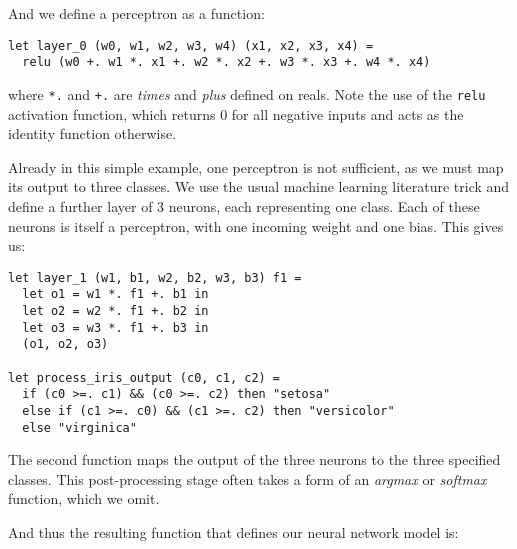 \documentclass[runningheads]{llncs}
\begin{document}
\begin{comment}
To process inputs of this type in the future, we can simply define

\begin{lstlisting}[language=caml]
let process_iris_input (x: iris_input) =
  let x0 = x.sepal_len in
  let x1 = x.sepal_width in
  let x2 = x.petal_len in
  let x3 = x.petal_width in
  (x1, x2, x3, x4)
\end{lstlisting}
\end{comment}

And we define a perceptron as a function:

\begin{lstlisting}[language=caml]
let layer_0 (w0, w1, w2, w3, w4) (x1, x2, x3, x4) =
  relu (w0 +. w1 *. x1 +. w2 *. x2 +. w3 *. x3 +. w4 *. x4)
\end{lstlisting}
where \lstinline{*.} and   \lstinline{+.} are \emph{times} and \emph{plus} defined on reals.  Note the use of the \lstinline{relu} activation function, which returns $0$ for all negative inputs and acts as the identity function otherwise.

Already in this simple example, one perceptron is not sufficient, as we must map its output to three classes. We use the usual machine learning literature trick and define a further layer of $3$ neurons, each representing one class. Each of these neurons is itself a perceptron, with one incoming weight and one bias. This gives us:

\begin{lstlisting}[language=caml]
let layer_1 (w1, b1, w2, b2, w3, b3) f1 =
  let o1 = w1 *. f1 +. b1 in
  let o2 = w2 *. f1 +. b2 in
  let o3 = w3 *. f1 +. b3 in
  (o1, o2, o3)

let process_iris_output (c0, c1, c2) =
  if (c0 >=. c1) && (c0 >=. c2) then "setosa"
  else if (c1 >=. c0) && (c1 >=. c2) then "versicolor"
  else "virginica"
\end{lstlisting}

\noindent The second function maps the output of the three neurons to the three specified classes. This post-processing stage often takes a
form of an \emph{argmax} or \emph{softmax} function, which we omit. %

And thus the resulting function that defines our neural network model is:
\end{document}
